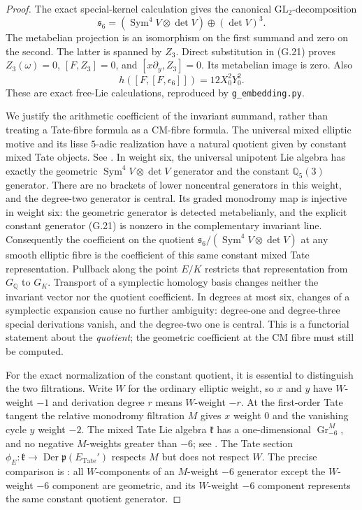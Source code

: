 \begin{proof}
The exact special-kernel calculation gives the canonical
$\mathrm{GL}_2$-decomposition
\[
 \mathfrak s_6=(\operatorname{Sym}^4 V\otimes\det V)
                 \oplus(\det V)^3.
\]
The metabelian projection is an isomorphism on the first summand and
zero on the second. The latter is spanned by $Z_3$. Direct substitution
in (G.21) proves $Z_3(\omega)=0$, $[F,Z_3]=0$, and
$[x\partial_y,Z_3]=0$. Its metabelian image is zero. Also
\[
 h([F,[F,\epsilon_6]])=12X_0^2Y_0^2.                   \tag{G.23}
\]
These are exact free-Lie calculations, reproduced by
\texttt{g\_embedding.py}.

We justify the arithmetic coefficient of the invariant summand,
rather than treating a Tate-fibre formula as a CM-fibre formula.
The universal mixed elliptic motive and its lisse \(5\)-adic realization
have a natural quotient given by constant mixed Tate objects.
See \citet[Definition 6.1, the exact sequence in \S7.1,
Proposition 20.1, Corollary 20.2, and \S22]{HainMatsumoto2020}.
In weight six, the universal unipotent Lie algebra has exactly the
geometric $\operatorname{Sym}^4V\otimes\det V$ generator and the
constant $\mathbb Q_5(3)$ generator. There are no brackets of lower
noncentral generators in this weight, and the degree-two generator
is central. Its graded monodromy map is injective in weight six:
the geometric generator is detected metabelianly, and the explicit
constant generator (G.21) is nonzero in the complementary invariant
line. Consequently the coefficient on the quotient
$\mathfrak s_6/(\operatorname{Sym}^4V\otimes\det V)$ at any smooth
elliptic fibre is the coefficient of this same constant mixed Tate
representation. Pullback along the point $E/K$ restricts that
representation from $G_{\mathbb Q}$ to $G_K$. Transport of a
symplectic homology basis changes neither the invariant vector nor
the quotient coefficient. In degrees at most six, changes of a
symplectic expansion cause no further ambiguity: degree-one and
degree-three special derivations vanish, and the degree-two one is
central. This is a functorial statement about the \emph{quotient};
the geometric coefficient at the CM fibre must still be computed.

For the exact normalization of the constant quotient, it is essential
to distinguish the two filtrations. Write $W$ for the ordinary
elliptic weight, so $x$ and $y$ have $W$-weight $-1$ and derivation
degree $r$ means $W$-weight $-r$. At the first-order Tate tangent
the relative monodromy filtration $M$ gives $x$ weight $0$ and the
vanishing cycle $y$ weight $-2$. The mixed Tate Lie algebra
$\mathfrak k$ has a one-dimensional $\operatorname{Gr}^M_{-6}$,
and no negative $M$-weights greater than $-6$; see
\citet[\S3 and Proposition 20.1]{HainMatsumoto2020}.
The Tate section $\phi_E:\mathfrak k\longrightarrow
\operatorname{Der}\mathfrak p(E_{\mathrm{Tate}}')$ respects $M$
but does not respect $W$. The precise comparison is
\citet[Proposition 29.1 and Corollary 29.2]{HainMatsumoto2020}:
all $W$-components of an $M$-weight $-6$ generator except the
$W$-weight $-6$ component are geometric, and its $W$-weight $-6$
component represents the same constant quotient generator.


\end{proof}
